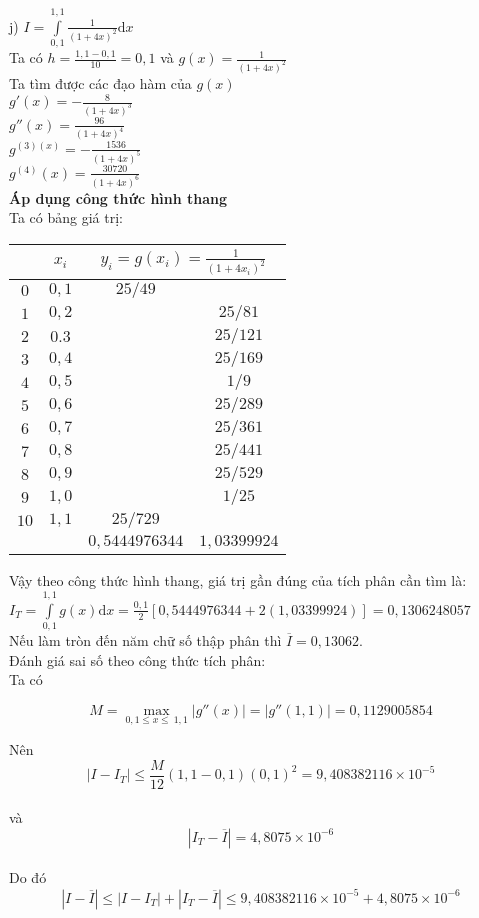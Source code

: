 j) $I=\int\limits_{0,1}^{1,1} \frac{1}{\left(1+4x\right)^2}\mathrm{d}x$\\
Ta có $h=\frac{1,1-0,1}{10}=0,1$ và $g\left(x\right)=\frac{1}{\left(1+4x\right)^2}$\\
Ta tìm được các đạo hàm của $g\left(x\right)$\\
$g'\left(x\right) = -\frac{8}{\left(1+4x\right)^3}$\\
$g''\left(x\right) = \frac{96}{\left(1+4x\right)^4}$\\
$g^{\left(3\right)\left(x\right)} = -\frac{1536}{\left(1+4x\right)^5}$\\
$g^{\left(4\right)}\left(x\right) =\frac{30720}{\left(1+4x\right)^6}$\\
\textbf{Áp dụng công thức hình thang}\\
Ta có bảng giá trị:\\
\begin{center}\begin{tabular}{|c|c|c|c|}
	\hline
	& $x_i$ & \multicolumn{2}{|c|}{$y_i=g\left(x_i\right)= \frac{1}{\left(1+4x_i\right)^2}$}\\ \hline 
	$0$ & $0,1$ & $25/49$ & \\ \hline
	$1$ & $0,2$ & & $25/81$ \\ \hline
	$2$ & $0.3$ & & $25/121$\\ \hline
	$3$ & $0,4$ & & $25/169$\\ \hline
	$4$ & $0,5$ & & $1/9$\\ \hline
	$5$ & $0,6$ & & $25/289$ \\ \hline
	$6$ & $0,7$ & & $25/361$ \\ \hline
	$7$ & $0,8$ & & $25/441$\\ \hline
	$8$ & $0,9$ & & $25/529$\\ \hline
	$9$ & $1,0$ & & $1/25$\\ \hline
	$10$ & $1,1$ & $25/729$ & \\ \hline
	& & $0,5444976344$ & $1,03399924$ \\ \hline
\end{tabular}\end{center}
Vậy theo công thức hình thang, giá trị gần đúng của tích phân cần tìm là:\\
$I_T=\int\limits_{0,1}^{1,1} g\left(x\right)\mathrm{d}x= \frac{0,1}{2}\left[0,5444976344 + 2\left(1,03399924\right) \right] =0,1306248057$\\
Nếu làm tròn đến năm chữ số thập phân thì $\overline{I}=0,13062$.\\
Đánh giá sai số theo công thức tích phân:\\
Ta có
\begin{center}
$$M=\underset{0,1 \leq x \leq\ 1,1}\max \left|g''\left(x\right) \right|= \left|g'' \left(1,1\right) \right|= 0,1129005854$$
\end{center}
Nên $$\left|I-I_T\right|\leq \frac{M}{12}\left(1,1-0,1\right)\left(0,1\right)^2=9,408382116\times 10^{-5}$$\\ và $$\left|I_T-\overline{I}\right| =4,8075\times 10^{-6}$$\\
Do đó\\
$$\left|I-\overline{I}\right| \leq \left| I- I_T \right| + \left| I_T -\overline{I} \right| \leq 9,408382116\times 10^{-5} + 4,8075\times 10^{-6} $$